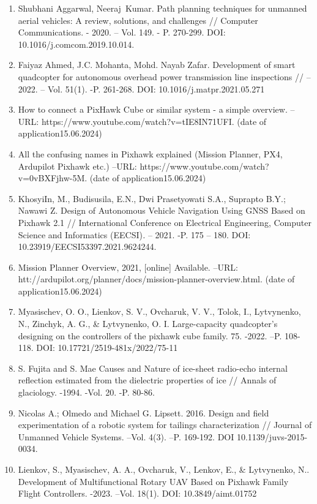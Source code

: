 \begin{enumerate}
\def\labelenumi{\arabic{enumi}.}
\item
  Shubhani Aggarwal, Neeraj~Kumar. Path planning techniques for unmanned
  aerial vehicles: A review, solutions, and challenges // Computer
  Communications. - 2020. -- Vol. 149. - P. 270-299. DOI:
  10.1016/j.comcom.2019.10.014.
\item
  Faiyaz Ahmed, J.C. Mohanta, Mohd. Nayab Zafar. Development of smart
  quadcopter for autonomous overhead power transmission line inspections
  // -- 2022. -- Vol. 51(1). -P. 261-268. DOI:
  10.1016/j.matpr.2021.05.271
\item
  How to connect a PixHawk Cube or similar system - a simple overview.
  --URL: https://www.youtube.com/watch?v=tIE8IN71UFI. (date of
  application15.06.2024)
\item
  All the confusing names in \textquotesingle Pixhawk\textquotesingle{}
  explained (Mission Planner, PX4, Ardupilot Pixhawk etc.) --URL:
  https://www.youtube.com/watch?v=0vBXFjhw-5M. (date of
  application15.06.2024)
\item
  Khosyi\textquotesingle In, M., Budisusila, E.N., Dwi Prasetyowati
  S.A., Suprapto B.Y.; Nawawi Z. Design of Autonomous Vehicle Navigation
  Using GNSS Based on Pixhawk 2.1 // International Conference on
  Electrical Engineering, Computer Science and Informatics
  (EECSI)\emph{.} -- 2021. -P. 175 -- 180. DOI:
  10.23919/EECSI53397.2021.9624244.
\item
  Mission Planner Overview, 2021, {[}online{]} Available. --URL:
  htt://ardupilot.org/planner/docs/mission-planner-overview.html. (date
  of application15.06.2024)
\item
  Myasischev, O. O., Lienkov, S. V., Ovcharuk, V. V., Tolok, I.,
  Lytvynenko, N., Zinchyk, A. G., \& Lytvynenko, O. I. Large-capacity
  quadcopter's designing on the controllers of the pixhawk cube family.
  75. -2022. --P. 108-118. DOI: 10.17721/2519-481x/2022/75-11
\item
  S. Fujita and S. Mae Causes and Nature of ice-sheet radio-echo
  internal reflection estimated from the dielectric properties of ice //
  Annals of glaciology. -1994. -Vol. 20. -P. 80-86.
\item
  Nicolas A.; Olmedo and Michael G. Lipsett. 2016. Design and field
  experimentation of a robotic system for tailings characterization //
  Journal of Unmanned Vehicle Systems. --Vol. 4(3). --P. 169-192. DOI
  10.1139/juvs-2015-0034.
\item
  Lienkov, S., Myasischev, A. A., Ovcharuk, V., Lenkov, E., \&
  Lytvynenko, N.. Development of Multifunctional Rotary UAV Based on
  Pixhawk Family Flight Controllers. -2023. --Vol. 18(1). DOI:
  10.3849/aimt.01752
\end{enumerate}

